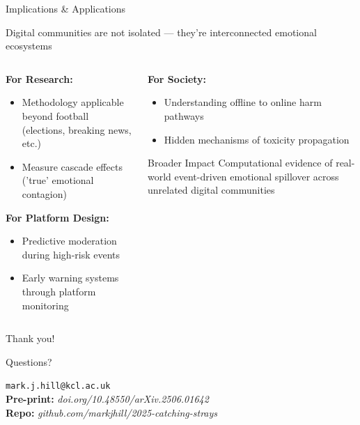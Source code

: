 \documentclass[10pt]{beamer}
\begin{document}
\begin{frame}{Implications \& Applications}

Digital communities are not isolated --- they're interconnected emotional ecosystems

\begin{columns}
\begin{column}{0.5\textwidth}

\textbf{For Research:}
\begin{itemize}
\item Methodology applicable beyond football (elections, breaking news, etc.)
\item Measure cascade effects ('true' emotional contagion)
\end{itemize}

\textbf{For Platform Design:}
\begin{itemize}
\item Predictive moderation during high-risk events
\item Early warning systems through platform monitoring
\end{itemize}

\end{column}
\begin{column}{0.5\textwidth}

\textbf{For Society:}
\begin{itemize}
\item Understanding offline to online harm pathways
\item Hidden mechanisms of toxicity propagation
\end{itemize}
 
\begin{block}{Broader Impact}
Computational evidence of real-world event-driven emotional spillover across unrelated digital communities
\end{block}
\end{column}
\end{columns}
\end{frame}


\appendix

\begin{frame}
\centering
\Huge Thank you!

\vspace{1em}
\Large Questions?

\vspace{2em}
\normalsize
\texttt{mark.j.hill@kcl.ac.uk}\\
\textbf{Pre-print:} \textit{doi.org/10.48550/arXiv.2506.01642}\\
\textbf{Repo:} \textit{github.com/markjhill/2025-catching-strays}
\end{frame}
\end{document}
